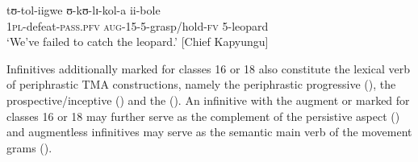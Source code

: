 \begin{exe}
\ex \label{exToligwa}
\gll tʊ-tol-iigwe ʊ-kʊ-lɪ-kol-a ii-bole\\
\textsc{1pl}-defeat-\textsc{pass.pfv} \textsc{aug}-15-5-grasp/hold-\textsc{fv} 5-leopard\\
\glt `We've failed to catch the leopard.' [Chief Kapyungu]
\end{exe}

Infinitives additionally marked for  classes 16 or 18 also constitute the lexical verb of periphrastic TMA constructions, namely the periphrastic progressive (), the prospective/inceptive () and the  (). An infinitive with the augment or marked for  classes 16 or 18 may further serve as the complement of the persistive aspect  () and augmentless infinitives may serve as the semantic main verb of the movement grams ().

